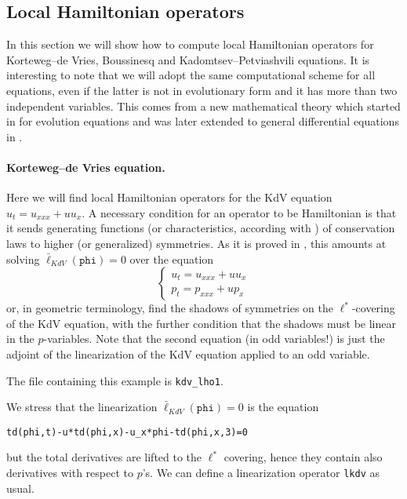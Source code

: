 \subsection{Local Hamiltonian operators}
\label{cdesec:local-hamilt-oper}

In this section we will show how to compute local Hamiltonian operators for
Korteweg--de Vries, Boussinesq and Kadomtsev--Petviashvili equations. It is
interesting to note that we will adopt the same computational scheme for all
equations, even if the latter is not in evolutionary form and it has more than
two independent variables. This comes from a new mathematical theory which
started in \cite{KerstenKrasilshchikVerboretsky:2004} for evolution equations and was later extended to general
differential equations in \cite{KerstenKrasilshchikVerbovetskyVitolo:HSGP}.

\paragraph*{Korteweg--de Vries equation.}
\label{cdesec:korteweg-de-vries}
Here we will find local Hamiltonian operators for the KdV equation
$u_t=u_{xxx}+uu_x$. A necessary condition for an operator to be Hamiltonian is
that it sends generating functions (or characteristics, according with
\cite{Olver:93}) of conservation laws to higher (or generalized) symmetries.
As it is proved in \cite{KerstenKrasilshchikVerboretsky:2004}, this amounts at solving $\bar
\ell_{KdV}(\mathtt{phi})=0$ over the equation
\[
  \left\{\begin{array}{l}
    u_t=u_{xxx}+uu_x\\
    p_t=p_{xxx}+up_x
  \end{array}\right.
\]
or, in geometric terminology, find the shadows of symmetries on the
$\ell^*$-covering of the KdV equation, with the further condition that the
shadows must be linear in the $p$-variables. Note that the second equation (in
odd variables!) is just the adjoint of the linearization of the KdV equation
applied to an odd variable.

The file containing this example is \texttt{kdv\_lho1}.

We stress that the linearization $\bar \ell_{KdV}(\mathtt{phi})=0$ is the
equation
\begin{verbatim}
td(phi,t)-u*td(phi,x)-u_x*phi-td(phi,x,3)=0
\end{verbatim}
but the total derivatives are lifted to the $\ell^*$ covering, hence they
contain also derivatives with respect to $p$'s. We can define a linearization
operator \texttt{lkdv} as usual.

